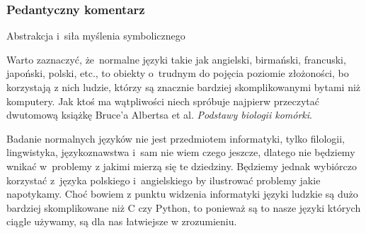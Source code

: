 \documentclass[10pt,t]{beamer}
\begin{document}
\begin{frame}
  \frametitle{Pedantyczny komentarz}

  Abstrakcja i~siła myślenia symbolicznego


  Warto zaznaczyć, że~normalne języki takie jak angielski, birmański,
  francuski, japoński, polski, etc., to obiekty o~trudnym do pojęcia
  poziomie złożoności, bo korzystają z nich ludzie, którzy są znacznie
  bardziej skomplikowanymi bytami niż komputery. Jak ktoś ma wątpliwości
  niech spróbuje najpierw przeczytać dwutomową książkę Bruce’a Albertsa
  et al. \textit{Podstawy biologii komórki}.

  Badanie normalnych języków nie jest przedmiotem informatyki, tylko
  filologii, lingwistyka, językoznawstwa i~sam nie wiem czego jeszcze,
  dlatego nie będziemy wnikać w~problemy z jakimi mierzą się te dziedziny.
  Będziemy jednak wybiórczo korzystać
  z~języka polskiego i~angielskiego by ilustrować problemy jakie napotykamy.
  Choć bowiem z punktu widzenia informatyki języki ludzkie są dużo bardziej
  skomplikowane niż C czy Python, to ponieważ są to \alert{nasze} języki
  których ciągle używamy, są dla nas łatwiejsze w zrozumieniu.


\end{frame}
\end{document}

